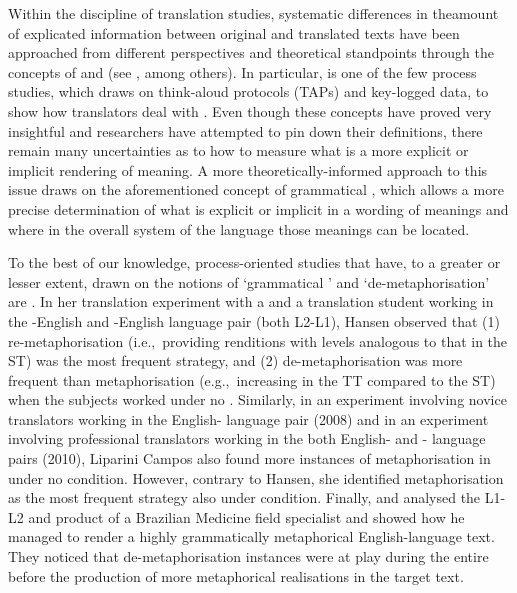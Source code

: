 \documentclass[output=paper]{LSP/langsci}
\begin{document}
Within the discipline of translation studies, systematic differences in the\linebreak amount of explicated information between original and translated texts have been approached from different perspectives and theoretical standpoints through the concepts of  and  (see \citealt{Vinay1958Engl, BlumKulka1986, Seguinot1988, Klaudy1998, Olohan2000}, among others). In particular, \citet{Englund2005} is one of the few process studies, which draws on think-aloud protocols (TAPs) and key-logged data, to show how translators deal with . Even though these concepts have proved very insightful and researchers have attempted to pin down their definitions, there remain many uncertainties as to how to measure what is a more explicit or implicit rendering of meaning. A more theoretically-informed approach to this issue draws on the aforementioned concept of grammatical , which allows a more precise determination of what is explicit or implicit in a wording of meanings and where in the overall system of the language those meanings can be located.

To the best of our knowledge, process-oriented studies that have, to a greater or lesser extent, drawn on the notions of `grammatical ' and `de-meta\-phor\-i\-sa\-tion' are \citet{Hansen2003, Liparini2008, Liparini2010, daSilva2007, Pagano2010Traducao}. In her translation experiment with a  and a translation student working in the -English and -English language pair (both L2-L1), Hansen observed that (1) re-meta\-phor\-i\-sa\-tion (i.e.,~providing renditions with  levels analogous to that in the ST) was the most frequent strategy, and (2) de-meta\-phor\-i\-sa\-tion was more frequent than metaphorisation (e.g.,~increasing  in the TT compared to the ST) when the subjects worked under no . Similarly, in an experiment involving novice translators working in the English- language pair (2008) and in an experiment involving professional translators working in the both English- and - language pairs (2010), Liparini Campos also found more instances of metaphorisation in under no  condition. However, contrary to Hansen, she identified metaphorisation as the most frequent strategy also under  condition. Finally, \citet{daSilva2007} and \citet{Pagano2010Traducao} analysed the L1-L2  and product of a Brazilian Medicine field specialist and showed how he managed to render a highly grammatically metaphorical English-language text. They noticed that de-meta\-phor\-i\-sa\-tion instances were at play during the entire  before the production of more metaphorical realisations in the target text.
\end{document}
